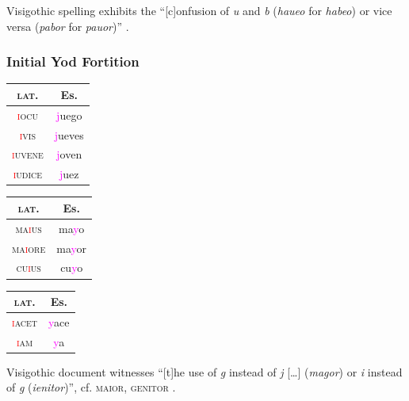 \documentclass{report}[12pt]
\begin{document}
Visigothic spelling exhibits the ``[c]onfusion of \emph{u} and \emph{b} (\emph{haueo} for \emph{habeo}) or vice versa (\emph{pabor} for \emph{pauor})'' \parencite[p.~159]{latin_palaeography}.

\subsubsection*{Initial Yod Fortition}

\begin{tcolorbox}

\end{tcolorbox}

\begin{tabular}{c c}
  \textsc{lat.} & Es. \\
  \hline
  \textsc{\textcolor{red}{i}ocu} & \textcolor{magenta}{j}uego \quad [x] \\
  \textsc{\textcolor{red}{i}vis} & \textcolor{magenta}{j}ueves \quad [x] \\
  \textsc{\textcolor{red}{i}uvene} & \textcolor{magenta}{j}oven \quad [x] \\
  \textsc{\textcolor{red}{i}udice} & \textcolor{magenta}{j}uez \quad [x] \\
\end{tabular}

\begin{tabular}{c c}
  \textsc{lat.} & Es. \\
  \hline
  \textsc{ma\textcolor{red}{i}us} & ma\textcolor{magenta}{y}o \\
  \textsc{ma\textcolor{red}{i}ore} & ma\textcolor{magenta}{y}or \\
  \textsc{cu\textcolor{red}{i}us} & cu\textcolor{magenta}{y}o \\
\end{tabular}

\begin{tabular}{c c}
  \textsc{lat.} & Es. \\
  \hline
  \textsc{\textcolor{red}{i}acet} & \textcolor{magenta}{y}ace \\
  \textsc{\textcolor{red}{i}am} & \textcolor{magenta}{y}a \\
\end{tabular}

Visigothic document witnesses ``[t]he use of \emph{g} instead of \emph{j} [\dots] (\emph{magor}) or \emph{i} instead of \emph{g} (\emph{ienitor})'', cf. \textsc{maior}, \textsc{genitor} \parencite[p.~159]{latin_palaeography}.
\end{document}
